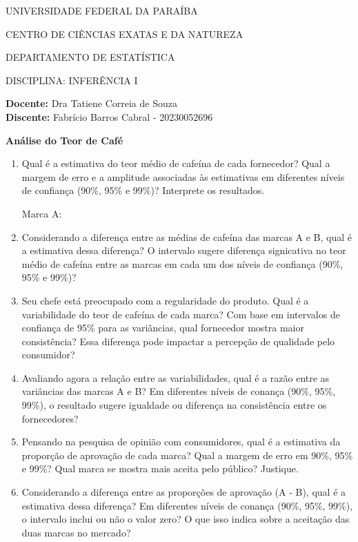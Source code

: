 \documentclass[11pt]{article}
\begin{document}
\begin{center}
UNIVERSIDADE FEDERAL DA PARAÍBA

CENTRO DE CIÊNCIAS EXATAS E DA NATUREZA

DEPARTAMENTO DE ESTATÍSTICA

DISCIPLINA: INFERÊNCIA I
\end{center}


\textbf{Docente:} Dra Tatiene Correia de Souza \\
\textbf{Discente:} Fabrício Barros Cabral - 20230052696\\

\begin{center}
{\Large \textbf{Análise do Teor de Café}}
\end{center}

\begin{enumerate}
    \item Qual é a estimativa do teor médio de cafeína de cada fornecedor? Qual
    a margem de erro e a amplitude associadas às estimativas em diferentes
    níveis de confiança (90\%, 95\% e 99\%)? Interprete os resultados.

    Marca A:

    \item Considerando a diferença entre as médias de cafeína das marcas A e B,
    qual é a estimativa dessa diferença? O intervalo sugere diferença
    signicativa no teor médio de cafeína entre as marcas em cada um dos níveis
    de confiança (90\%, 95\% e 99\%)?
    \item Seu chefe está preocupado com a regularidade do produto. Qual é a
    variabilidade do teor de cafeína de cada marca? Com base em intervalos de
    confiança de 95\% para as variâncias, qual fornecedor mostra maior
    consistência? Essa diferença pode impactar a percepção de qualidade pelo
    consumidor?
    \item Avaliando agora a relação entre as variabilidades, qual é a razão
    entre as variâncias das marcas A e B? Em diferentes níveis de conança (90\%,
    95\%, 99\%), o resultado sugere igualdade ou diferença na consistência entre
    os fornecedores?
    \item Pensando na pesquisa de opinião com consumidores, qual é a estimativa
    da proporção de aprovação de cada marca? Qual a margem de erro em 90\%, 95\%
    e 99\%? Qual marca se mostra mais aceita pelo público? Justique.
    \item Considerando a diferença entre as proporções de aprovação (A - B),
    qual é a estimativa dessa diferença? Em diferentes níveis de conança (90\%,
    95\%, 99\%), o intervalo inclui ou não o valor zero? O que isso indica sobre
    a aceitação das duas marcas no mercado?
\end{enumerate}
\end{document}
